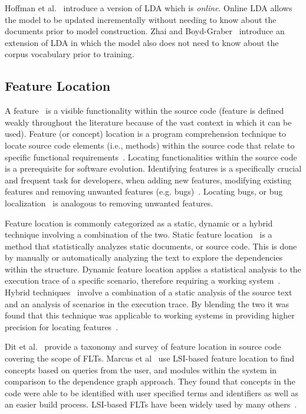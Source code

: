 Hoffman et al.~\cite{Hoffman-etal:2010} introduce a version of LDA which is
\emph{online}.
Online LDA allows the model to be updated incrementally without needing
to know about the documents prior to model construction.
Zhai and Boyd-Graber~\cite{Zhai-Boyd-Graber:2013} introduce an extension of LDA
in which the model also does not need to know about the corpus vocabulary prior to training.


\subsection{Feature Location}

A feature~\cite{Biggerstaff-etal:1993} is a visible functionality within the source code
(feature is defined weakly throughout the literature because of the vast
context in which it can be used). Feature (or concept) location is a program
comprehension technique to locate source code elements (i.e., methods)
within the source code that relate to specific functional
requirements~\cite{Eisenbarth-etal:2001, Biggers-etal:2014}. Locating functionalities
within the source code is a prerequisite for software evolution.  Identifying features is a specifically crucial and frequent task for
developers, when adding new features, modifying existing features and removing
unwanted features (e.g.  bugs)~\cite{Rajlich-Gosavi:2004, Dit-etal:2013b}. Locating bugs,
or bug localization~\cite{Lukins-etal:2008, Bassett-Kraft:2013} is analogous to removing unwanted features.

Feature location is commonly categorized as a static, dynamic or a hybrid
technique involving a combination of the two. Static feature
location~\cite{Zhao-etal:2006} is a method that statistically analyzes
static documents, or source code. This is done by manually or automatically
analyzing the text to explore the dependencies within the structure. Dynamic
feature location applies a statistical analysis to the execution trace of a
specific scenario, therefore requiring a working system~\cite{Eisenbarth-etal:2001,Poshyvanyk-etal:2007}.
Hybrid techniques~\cite{Eisenbarth-etal:2003, Eaddy-etal:2008, Revelle-etal:2010} involve a combination of a static analysis of
the source text and an analysis of scenarios in the execution trace. By
blending the two it was found that this technique was applicable to working
systems in providing higher precision for locating features~\cite{Poshyvanyk-etal:2007,
Ernst:2004, Revelle-Coppitt:UNK}.

Dit et al.~\cite{Dit-etal:2013b} provide a taxonomy and survey of feature
location in source code covering the scope of FLTs.  Marcus et
al~\cite{Marcus-etal:2004} use LSI-based feature location to find concepts based on
queries from the user, and modules within the system in comparison to the
dependence graph approach. They found that concepts in the code were able to be
identified with user specified terms and identifiers as well as an easier build
process. LSI-based FLTs have been widely used by many others~\cite{
Poshyvanyk-etal:2006, Poshyvanyk-Marcus:2007, Liu-etal:2007, Scanniello-Marcus:2011,
Eaddy-etal:2008, Cubranic-etal:2005}.


